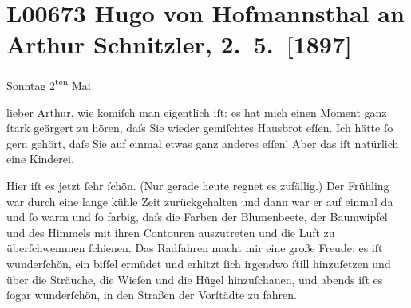 

\section[Hugo von Hofmannsthal an Arthur Schnitzler, 2. 5. {[}1897{]}]{L00673 Hugo von Hofmannsthal an Arthur Schnitzler, 2. 5. {[}1897{]}}
\nopagebreak{}
\rehead{ }\normalsize\beginnumbering{}
\toendnotes[C]{\smallbreak\pagebreak[2]}
\toendnotes[C]{\smallbreak}
\pstart
           {\pb}\textcolor{gray}{\textbf{\label{T_L00673-1v}\label{T_L00673-1}}}\pend
           
\pstart
           \raggedleft{}Sonntag 2\textsuperscript{ten} Mai\pend
           
\pstart{}lieber Arthur,\pend\vspace{0.5em}
\pstart
           wie komiſch man eigentlich iſt: es hat mich einen Moment ganz ſtark geärgert zu
               hören, daſs Sie wieder gemiſchtes Hausbrot eſſen. Ich hätte ſo gern gehört, daſs Sie
               auf einmal etwas ganz anderes eſſen! Aber das iſt natürlich eine Kinderei.\pend
           
\pstart
           Hier iſt es jetzt ſehr ſchön. (Nur gerade heute regnet es zufällig.) Der Frühling war
                  {\pb}durch eine lange kühle Zeit
               zurückgehalten und dann war er auf einmal da und ſo warm und ſo farbig, daſs die
               Farben der Blumenbeete, der Baumwipfel und des Himmels mit ihren Contouren
               auszutreten und die Luft zu überſchwemmen ſchienen. Das Radfahren macht mir eine
               große Freude: es iſt wunderſchön, ein biſſel ermüdet und erhitzt ſich irgendwo ſtill
               hinzuſetzen {\pb}und über die
               Sträuche, die Wieſen und die Hügel hinzuſchauen, und abends iſt es ſogar wunderſchön,
               in den Straßen der Vorſtädte zu fahren.\pend
           
